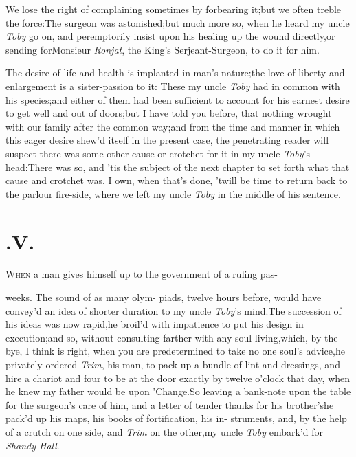 \documentclass{article}
\begin{document}
\tsk We lose the right of complaining sometimes by forbearing
it;\tsk but we often treble the force:\tsk The surgeon was
astonished;\tsk but much more so, when he heard my uncle \textit{Toby} go on,
and peremptorily insist upon his healing up the wound
directly,\tsh or sending for\break Monsieur \textit{Ronjat}, the
King’s Serjeant-\break Surgeon, to do it for him.

The desire of life and health is implanted in man’s
nature;\tsh the love of liberty and enlargement is a
sister-passion to it: These my uncle \textit{Toby} had in common with
his species;\tsk and either of them had been sufficient to account for his earnest
desire to get well and out of doors;\tsk but I have told
you before, that nothing wrought with our family after the common
way;\tsh and from the time and manner in which this eager
desire shew’d itself in the present case, the penetrating reader
will suspect there was some other cause or crotchet for it in my
uncle \textit{Toby}’s head:\tsk There was so, and
’tis the subject of the next chapter to set forth what that
cause and crotchet was. I own, when that’s done, ’twill
be time to return back to the parlour fire-side, where we left my
uncle \textit{Toby} in the middle of his sentence.

\bigskip

\section{.\enspace  V.}

\lettrine{W}{hen} a man gives himself up to\break 
the government of a ruling pas-\break
{}

\noindent
{}
weeks. The sound of as many olym-\break
piads, twelve hours before, would have
convey’d an idea of shorter duration to my uncle
\textit{Toby}’s mind.\tsh The succession of his ideas
was now rapid,\tsk he broil’d with impatience to put his design
in execution;\tsk and so, without consulting farther with
any soul living,\tsk which, by the bye, I think is right, when
you are predetermined to take no one soul’s
advice,\tsk he privately ordered \textit{Trim}, his man, to
pack up a bundle of lint and dressings, and hire a chariot and four
to be at the door exactly by twelve o’clock that day, when he
knew my father would be upon ’Change.\tsk So leaving
a bank-note upon the table for the surgeon’s care of him, and
a letter of tender thanks\break 
for his brother’s\tsk he pack’d up his\break
maps, his books of fortification, his in-\break
struments, \etc\tsk and, by the help of a
crutch on one side, and \textit{Trim} on the\break
other,\tsh my uncle \textit{Toby} embark’d for\break
\textit{Shandy-Hall}.
\end{document}
